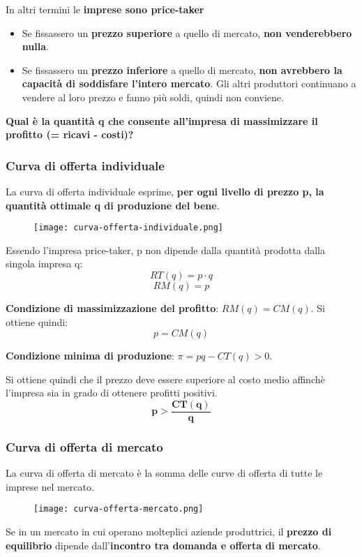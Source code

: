 \documentclass[../main.tex]{subfiles}
\begin{document}
In altri termini le \textbf{imprese sono price-taker}
\begin{itemize}
    \item Se fissassero un \textbf{prezzo superiore} a quello di mercato, \textbf{non venderebbero nulla}.
    \item Se fissassero un \textbf{prezzo inferiore} a quello di mercato, \textbf{non avrebbero la capacità di soddisfare l'intero mercato}. Gli altri produttori continuano a vendere al loro prezzo e fanno più soldi, quindi non conviene.
\end{itemize}

\textbf{Qual è la quantità q che consente all'impresa di massimizzare il profitto (= ricavi - costi)?}

\subsubsection{Curva di offerta individuale}
La curva di offerta individuale esprime, \textbf{per ogni livello di prezzo p, la quantità ottimale q di produzione del bene}.

\begin{figure}[h]
    \centering
    \texttt{[image: curva-offerta-individuale.png]}
\end{figure}

Essendo l'impresa price-taker, p non dipende dalla quantità prodotta dalla singola impresa q:
$$RT(q) = p\cdot q$$
$$RM(q) = p$$

\textbf{Condizione di massimizzazione del profitto}: $RM(q) = CM(q)$. Si ottiene quindi:
$$p = CM(q)$$

\textbf{Condizione minima di produzione}: $\pi = pq - CT(q) > 0$.

Si ottiene quindi che il prezzo deve essere superiore al costo medio affinchè l'impresa sia in grado di ottenere profitti positivi.
$$\mathbf{p > \frac{CT(q)}{q}}$$

\subsubsection{Curva di offerta di mercato}
La curva di offerta di mercato è la somma delle curve di offerta di tutte le imprese nel mercato.

\begin{figure}[h]
    \centering
    \texttt{[image: curva-offerta-mercato.png]}
\end{figure}

Se in un mercato in cui operano molteplici aziende produttrici, il \textbf{prezzo di equilibrio} dipende dall'\textbf{incontro tra domanda e offerta di mercato}.
\end{document}
